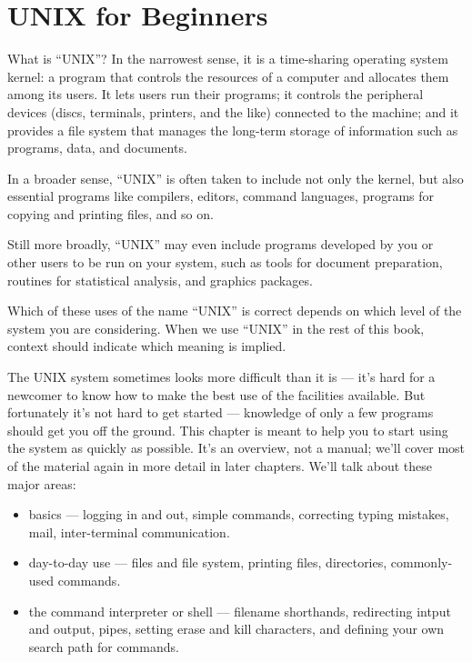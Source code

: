 \chapter{UNIX for Beginners}


What is ``UNIX''? In the narrowest sense, it is a time-sharing operating system
kernel: a program that controls the resources of a computer and allocates them
among its users. It lets users run their programs; it controls the peripheral
devices (discs, terminals, printers, and the like) connected to the machine; and
it provides a file system that manages the long-term storage of information such
as programs, data, and documents.

In a broader sense, ``UNIX'' is often taken to include not only the kernel, but
also essential programs like compilers, editors, command languages, programs for
copying and printing files, and so on.

Still more broadly, ``UNIX'' may even include programs developed by you or other
users to be run on your system, such as tools for document preparation, routines
for statistical analysis, and graphics packages.

Which of these uses of the name ``UNIX'' is correct depends on which level of
the system you are considering. When we use ``UNIX'' in the rest of this book,
context should indicate which meaning is implied.

The UNIX system sometimes looks more difficult than it is --- it's hard for a
newcomer to know how to make the best use of the facilities available. But
fortunately it's not hard to get started --- knowledge of only a few programs
should get you off the ground. This chapter is meant to help you to start using
the system as quickly as possible. It's an overview, not a manual; we'll cover
most of the material again in more detail in later chapters. We'll talk about
these major areas:

\begin{itemize}
\item basics --- logging in and out, simple commands, correcting typing
  mistakes, mail, inter-terminal communication.
\item day-to-day use --- files and file system, printing files, directories,
  commonly-used commands.
\item the command interpreter or shell --- filename shorthands, redirecting
  intput and output, pipes, setting erase and kill characters, and defining your
  own search path for commands.
\end{itemize}
  

